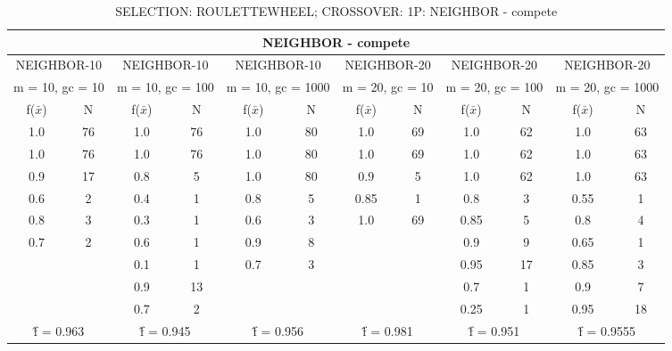 \begin{table}[H]
	\centering
	\caption{SELECTION: ROULETTEWHEEL; CROSSOVER: 1P: NEIGHBOR - compete}
	\begin{adjustbox}{width=1\textwidth}
		\begin{tabular}{ |c|c||c|c||c|c||c|c||c|c||c|c| }
			\hline
			\multicolumn{12}{|c|}{NEIGHBOR - compete} \\
			\hline
			\multicolumn{2}{|c||}{NEIGHBOR-10} & \multicolumn{2}{c||}{NEIGHBOR-10} & \multicolumn{2}{c||}{NEIGHBOR-10} & \multicolumn{2}{c||}{NEIGHBOR-20} & \multicolumn{2}{c||}{NEIGHBOR-20} & \multicolumn{2}{c|}{NEIGHBOR-20}\\
			\hline
			\multicolumn{2}{|c||}{m = 10, gc = 10} & \multicolumn{2}{c||}{m = 10, gc = 100} & \multicolumn{2}{c||}{m = 10, gc = 1000} & \multicolumn{2}{c||}{m = 20, gc = 10} & \multicolumn{2}{c||}{m = 20, gc = 100} & \multicolumn{2}{c|}{m = 20, gc = 1000}\\
			\hline
			f($\bar{x}$) & N & f($\bar{x}$) & N & f($\bar{x}$) & N & f($\bar{x}$) & N & f($\bar{x}$) & N & f($\bar{x}$) & N\\
			\hline
			\hline
			1.0 & 76 & 1.0 & 76 & 1.0 & 80 & 1.0 & 69 & 1.0 & 62 & 1.0 & 63\\
			\hline
			1.0 & 76 & 1.0 & 76 & 1.0 & 80 & 1.0 & 69 & 1.0 & 62 & 1.0 & 63\\
			0.9 & 17 & 0.8 & 5 & 1.0 & 80 & 0.9 & 5 & 1.0 & 62 & 1.0 & 63\\
			0.6 & 2 & 0.4 & 1 & 0.8 & 5 & 0.85 & 1 & 0.8 & 3 & 0.55 & 1\\
			0.8 & 3 & 0.3 & 1 & 0.6 & 3 & 1.0 & 69 & 0.85 & 5 & 0.8 & 4\\
			0.7 & 2 & 0.6 & 1 & 0.9 & 8 &   &   & 0.9 & 9 & 0.65 & 1\\
			&   & 0.1 & 1 & 0.7 & 3 &   &   & 0.95 & 17 & 0.85 & 3\\
			&   & 0.9 & 13 &   &   &   &   & 0.7 & 1 & 0.9 & 7\\
			&   & 0.7 & 2 &   &   &   &   & 0.25 & 1 & 0.95 & 18\\
			\hline
			\multicolumn{2}{|c||}{\^{f} = 0.963} & \multicolumn{2}{c||}{\^{f} = 0.945} & \multicolumn{2}{c||}{\^{f} = 0.956} & \multicolumn{2}{c||}{\^{f} = 0.981} & \multicolumn{2}{c||}{\^{f} = 0.951} & \multicolumn{2}{c|}{\^{f} = 0.9555}\\
			\hline
		\end{tabular}
	\end{adjustbox}
\end{table}

